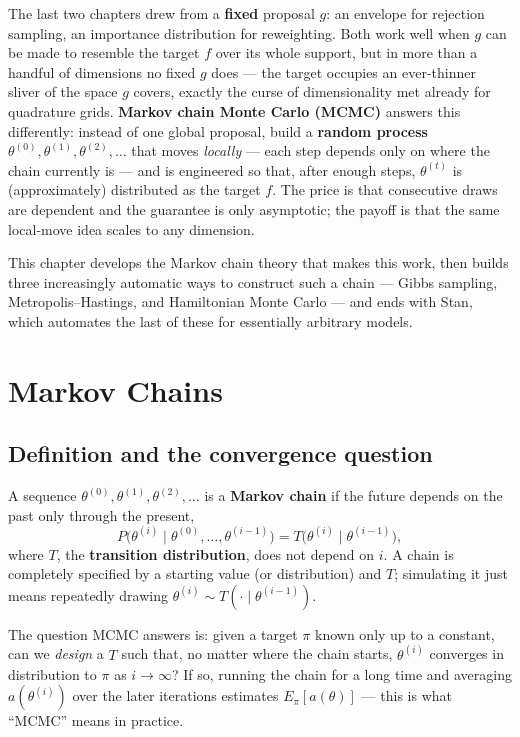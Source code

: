 \documentclass[
  letterpaper,
  DIV=11,
  numbers=noendperiod]{scrreprt}
\begin{document}
The last two chapters drew from a \textbf{fixed} proposal \(g\): an
envelope for rejection sampling, an importance distribution for
reweighting. Both work well when \(g\) can be made to resemble the
target \(f\) over its whole support, but in more than a handful of
dimensions no fixed \(g\) does --- the target occupies an ever-thinner
sliver of the space \(g\) covers, exactly the curse of dimensionality
met already for quadrature grids. \textbf{Markov chain Monte Carlo
(MCMC)} answers this differently: instead of one global proposal, build
a \textbf{random process}
\(\theta^{(0)}, \theta^{(1)}, \theta^{(2)}, \ldots\) that moves
\emph{locally} --- each step depends only on where the chain currently
is --- and is engineered so that, after enough steps, \(\theta^{(t)}\)
is (approximately) distributed as the target \(f\). The price is that
consecutive draws are dependent and the guarantee is only asymptotic;
the payoff is that the same local-move idea scales to any dimension.

This chapter develops the Markov chain theory that makes this work, then
builds three increasingly automatic ways to construct such a chain ---
Gibbs sampling, Metropolis--Hastings, and Hamiltonian Monte Carlo ---
and ends with Stan, which automates the last of these for essentially
arbitrary models.

\section{Markov Chains}\label{markov-chains}

\subsection{Definition and the convergence
question}\label{definition-and-the-convergence-question}

A sequence \(\theta^{(0)}, \theta^{(1)}, \theta^{(2)}, \ldots\) is a
\textbf{Markov chain} if the future depends on the past only through the
present, \[
P\big(\theta^{(i)} \mid \theta^{(0)}, \ldots, \theta^{(i-1)}\big) = T\big(\theta^{(i)} \mid \theta^{(i-1)}\big),
\] where \(T\), the \textbf{transition distribution}, does not depend on
\(i\). A chain is completely specified by a starting value (or
distribution) and \(T\); simulating it just means repeatedly drawing
\(\theta^{(i)} \sim T(\cdot \mid \theta^{(i-1)})\).

The question MCMC answers is: given a target \(\pi\) known only up to a
constant, can we \emph{design} a \(T\) such that, no matter where the
chain starts, \(\theta^{(i)}\) converges in distribution to \(\pi\) as
\(i \to \infty\)? If so, running the chain for a long time and averaging
\(a(\theta^{(i)})\) over the later iterations estimates
\(E_\pi[a(\theta)]\) --- this is what ``MCMC'' means in practice.
\end{document}
